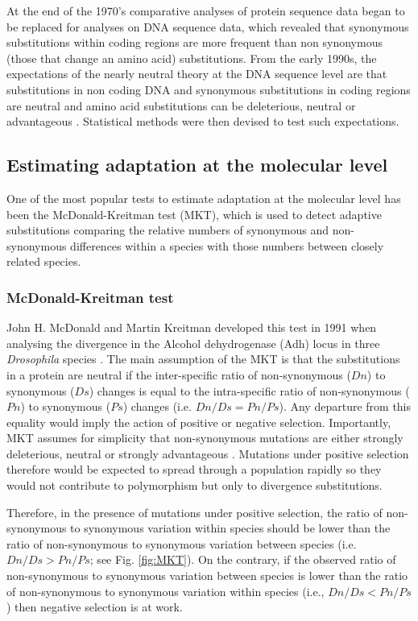 At the end of the 1970's comparative analyses of protein sequence data began to be replaced for analyses on DNA sequence data, which revealed that synonymous substitutions within coding regions are more frequent than non synonymous (those that change an amino acid) substitutions.
%
From the early 1990s, the expectations of the nearly neutral theory at the DNA sequence level are that substitutions in non coding DNA and synonymous substitutions in coding regions are neutral and amino acid substitutions can be deleterious, neutral or advantageous \citep{Ohta1996}. Statistical methods were then devised to test such expectations.

\subsection{Estimating adaptation at the molecular level}
One of the most popular tests to estimate adaptation at the molecular level has been the McDonald-Kreitman test (MKT), which is used to detect adaptive substitutions comparing the relative numbers of synonymous and non-synonymous differences within a species with those numbers between closely related species.

\subsubsection{McDonald-Kreitman test}


John H. McDonald and Martin Kreitman developed this test in 1991 when analysing the divergence in the Alcohol dehydrogenase (Adh) locus in three \textit{Drosophila} species	\citep{McDonald1991}. 
%
The main assumption of the MKT is that the substitutions in a protein are neutral if the inter-specific ratio of non-synonymous ($Dn$) to synonymous ($Ds$) changes is equal to the intra-specific ratio of non-synonymous ($Pn$) to synonymous ($Ps$) changes (i.e. $Dn/Ds = Pn/Ps$).
Any departure from this equality would imply the action of positive or negative selection.
%
Importantly, MKT assumes for simplicity that non-synonymous mutations are either strongly deleterious, neutral or strongly advantageous \citep{McDonald1991}.
%
Mutations under positive selection therefore would be expected to spread through a population rapidly so they would not contribute to polymorphism but only to divergence substitutions.

Therefore, in the presence of mutations under positive selection, the ratio of non-synonymous to synonymous variation within species should be lower than the ratio of non-synonymous to synonymous variation between species (i.e. $Dn/Ds > Pn/Ps$; see Fig. \ref{fig:MKT}). 
On the contrary, if the observed ratio of non-synonymous to synonymous variation between species is lower than the ratio of non-synonymous to synonymous variation within species (i.e., $Dn/Ds < Pn/Ps$) then negative selection is at work.
%

